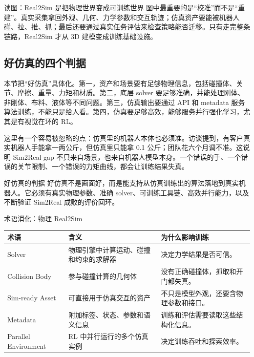 \documentclass[a4paper]{article}
\begin{document}
\begin{knowledgebox}{读图：Real2Sim 是把物理世界变成可训练世界}
图中最重要的是“校准”而不是“重建”。真实采集拿回外观、几何、力学参数和交互轨迹；仿真资产要能被机器人碰、拉、推、抓；最后还要通过真实任务评估来检查策略能否迁移。只有走完整条链路，Real2Sim 才从 3D 建模变成训练基础设施。
\end{knowledgebox}

\subsection{好仿真的四个判据}

本节把“好仿真”具体化。第一，资产和场景要有足够物理信息，包括碰撞体、关节、摩擦、重量、力矩和材质。第二，底层 solver 要足够准确，并能处理刚体、非刚体、布料、液体等不同问题。第三，仿真输出要通过 API 和 metadata 服务算法训练，不能只是给人看。第四，仿真要足够高效，能够服务并行强化学习，尤其是有视觉在环的 RL。

这里有一个容易被忽略的点：仿真里的机器人本体也必须准。访谈提到，有客户真实机器人手能拿一两公斤，但仿真里只能拿 0.1 公斤；团队花六个月调不准。这说明 Sim2Real gap 不只来自场景，也来自机器人模型本身。一个错误的手、一个错误的关节限制、一个错误的力矩曲线，都会让训练结果失真。

\begin{importantbox}{好仿真的判据}
好仿真不是画面好，而是能支持从仿真训练出的算法落地到真实机器人。它必须有真实物理参数、准确 solver、可训练工具链、高效并行能力，以及不断验证 Sim2Real 成败的评价回环。
\end{importantbox}

\begin{knowledgebox}{术语消化：物理 Real2Sim}
\begin{tabularx}{\textwidth}{p{}p{}X}
\toprule
术语 & 含义 & 为什么影响训练 \\
\midrule
Solver & 物理引擎中计算运动、碰撞和约束的求解器 & 决定力学结果是否可信。 \\
Collision Body & 参与碰撞计算的几何体 & 没有正确碰撞体，抓取和开门都失真。 \\
Sim-ready Asset & 可直接用于仿真交互的资产 & 不只是模型外观，还要含物理参数和接口。 \\
Metadata & 附加标签、状态、参数和语义信息 & 训练和评估需要读取这些结构化信息。 \\
Parallel Environment & RL 中并行运行的多个仿真实例 & 决定训练吞吐和探索效率。 \\
\bottomrule
\end{tabularx}
\end{knowledgebox}
\end{document}
